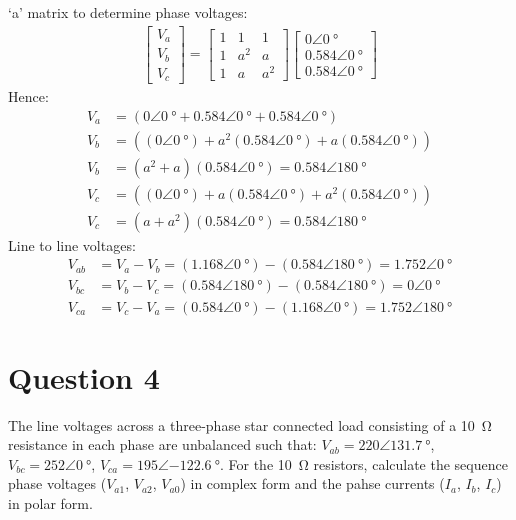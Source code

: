 `a' matrix to determine phase voltages:
\begin{gather}
    \begin{bmatrix}
        V_a \\
        V_b \\
        V_c
    \end{bmatrix} = \begin{bmatrix}
        1 & 1   & 1   \\
        1 & a^2 & a   \\
        1 & a   & a^2
    \end{bmatrix}\begin{bmatrix}
        0\angle\SI{0}{\degree}     \\
        0.584\angle\SI{0}{\degree} \\
        0.584\angle\SI{0}{\degree}
    \end{bmatrix}
\end{gather}
Hence:
\begin{align}
    V_a & = \left(0\angle\SI{0}{\degree}+0.584\angle\SI{0}{\degree}+0.584\angle\SI{0}{\degree}\right)                                            \\
    V_b & = \left(\left(0\angle\SI{0}{\degree}\right)+a^2\left(0.584\angle\SI{0}{\degree}\right)+a\left(0.584\angle\SI{0}{\degree}\right)\right) \\
    V_b & = \left(a^2 + a\right)\left(0.584\angle\SI{0}{\degree}\right) = 0.584\angle\SI{180}{\degree}                                           \\
    V_c & = \left(\left(0\angle\SI{0}{\degree}\right)+a\left(0.584\angle\SI{0}{\degree}\right)+a^2\left(0.584\angle\SI{0}{\degree}\right)\right) \\
    V_c & = \left(a + a^2\right)\left(0.584\angle\SI{0}{\degree}\right) = 0.584\angle\SI{180}{\degree}
\end{align}
Line to line voltages:
\begin{align}
    V_{ab} & = V_a - V_b = \left(1.168\angle\SI{0}{\degree}\right) - \left(0.584\angle\SI{180}{\degree}\right) = 1.752\angle\SI{0}{\degree} \\
    V_{bc} & = V_b - V_c = \left(0.584\angle\SI{180}{\degree}\right) - \left(0.584\angle\SI{180}{\degree}\right) = 0\angle\SI{0}{\degree}   \\
    V_{ca} & = V_c - V_a = \left(0.584\angle\SI{0}{\degree}\right) - \left(1.168\angle\SI{0}{\degree}\right) = 1.752\angle\SI{180}{\degree}
\end{align}
\section{Question 4}
The line voltages across a three-phase star connected load consisting of a \SI{10}{\ohm} resistance in each phase are unbalanced such that: $V_{ab}=220\angle\SI{131.7}{\degree}$, $V_{bc}=252\angle\SI{0}{\degree}$, $V_{ca}=195\angle\SI{-122.6}{\degree}$. For the \SI{10}{\ohm} resistors, calculate the sequence phase voltages ($V_{a1}$, $V_{a2}$, $V_{a0}$) in complex form and the pahse currents ($I_{a}$, $I_{b}$, $I_{c}$) in polar form.

